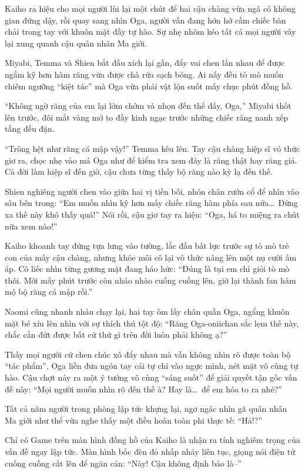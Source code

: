 \documentclass[../main.tex]{subfiles}
\begin{document}
Kaiho ra hiệu cho mọi người lùi lại một chút để hai cậu chàng vừa ngã có không gian đứng dậy, rồi quay sang nhìn Oga, người vẫn đang hớn hở cầm chiếc bàn chải trong tay với khuôn mặt đầy tự hào. Sự nhẹ nhõm kéo tất cả mọi người vây lại xung quanh cậu quân nhân Ma giới.

Miyabi, Temma và Shien bắt đầu xích lại gần, đẩy vai chen lấn nhau để được ngắm kỹ hơn hàm răng vừa được chà rửa sạch bóng. Ai nấy đều tò mò muốn chiêm ngưỡng ``kiệt tác'' mà Oga vừa phải vật lộn suốt mấy chục phút đồng hồ.

``Không ngờ răng của em lại lởm chởm và nhọn đến thế đấy, Oga,'' Miyabi thốt lên trước, đôi mắt vàng mở to đầy kinh ngạc trước những chiếc răng nanh xếp tầng đều đặn.

``Trông hệt như răng cá mập vậy!'' Temma kêu lên. Tay cậu chàng hiệp sĩ vô thức giơ ra, chọc nhẹ vào má Oga như để kiểm tra xem đây là răng thật hay răng giả. Cả đời làm hiệp sĩ đến giờ, cậu chưa từng thấy bộ răng nào kỳ lạ đến thế.

Shien nghiêng người chen vào giữa hai vị tiền bối, nhón chân rướn cổ để nhìn vào sâu bên trong: ``Em muốn nhìn kỹ hơn mấy chiếc răng hàm phía sau nữa\dots\ Đứng xa thế này khó thấy quá!'' Nói rồi, cậu giơ tay ra hiệu: ``Oga, há to miệng ra chút nữa xem nào!''

Kaiho khoanh tay đứng tựa lưng vào tường, lắc đầu bất lực trước sự tò mò trẻ con của mấy cậu chàng, nhưng khóe môi cô lại vô thức nâng lên một nụ cười ấm áp. Cô liếc nhìn từng gương mặt đang háo hức: ``Đúng là tụi em chỉ giỏi tò mò thôi. Mới mấy phút trước còn nháo nhào cuống cuồng lên, giờ lại thành fan hâm mộ bộ răng cá mập rồi.''

Naomi cũng nhanh nhảu chạy lại, hai tay ôm lấy chân quần Oga, ngẩng khuôn mặt bé xíu lên nhìn với sự thích thú tột độ: ``Răng Oga-oniichan sắc lẹm thế này, chắc cắn đứt được bất cứ thứ gì trên đời luôn phải không ạ?''

Thấy mọi người cứ chen chúc xô đẩy nhau mà vẫn không nhìn rõ được toàn bộ ``tác phẩm'', Oga liền đưa ngón tay cái tự chỉ vào ngực mình, nét mặt vô cùng tự hào. Cậu chợt nảy ra một ý tưởng vô cùng ``sáng suốt'' để giải quyết tận gốc vấn đề này: ``Mọi người muốn nhìn rõ đến thế à? Hay là\dots\ để em hóa to ra nhé?''

Tất cả năm người trong phòng lập tức khựng lại, ngơ ngác nhìn gã quân nhân Ma giới như thể vừa nghe thấy một điều hoàn toàn phi thực tế: ``Hả!?''

Chỉ có Game trên màn hình đồng hồ của Kaiho là nhận ra tính nghiêm trọng của vấn đề ngay lập tức. Màn hình bốc đèn đỏ nhấp nháy liên tục, giọng nói điện tử cuống cuồng cất lên để ngăn cản: ``Này! Cậu không định bảo là--''
\end{document}
